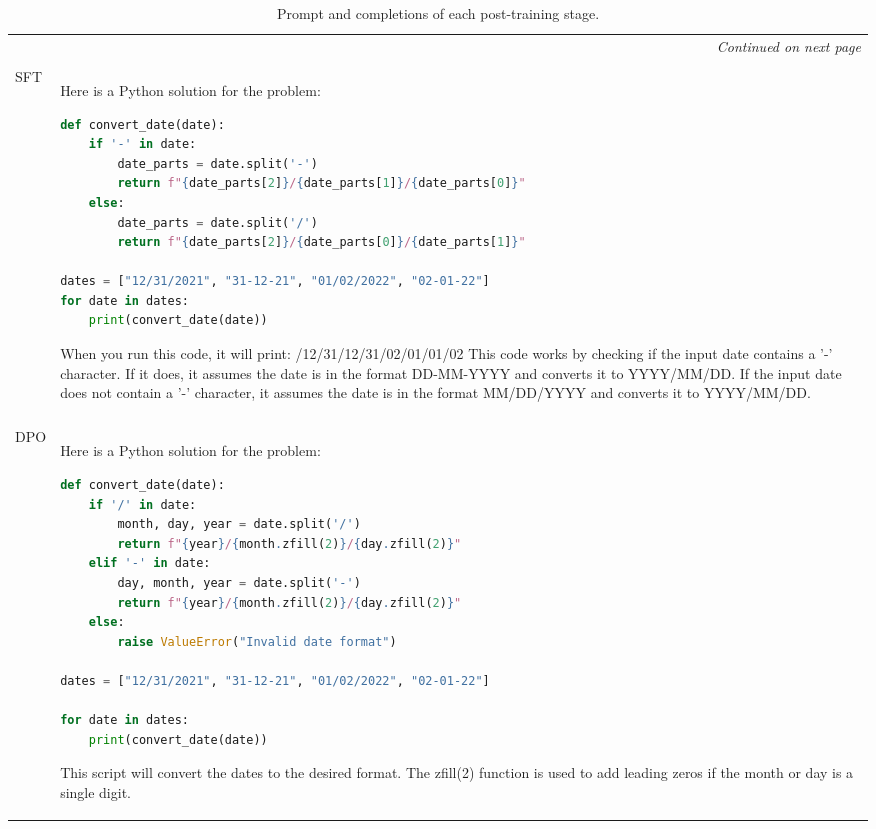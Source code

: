 \begin{CJK}{UTF8}{mj}
\begin{longtable}{lp{}}
\midrule
\multicolumn{2}{r}{\textit{Continued on next page}} \\
\endfoot

\bottomrule
\caption{Prompt and completions of each post-training stage.}
\label{tab:completions_during_post_train_2} \\
\endlastfoot

SFT & Here is a Python solution for the problem:

\begin{lstlisting}[language=Python, basicstyle=\scriptsize]
def convert_date(date):
    if '-' in date:
        date_parts = date.split('-')
        return f"{date_parts[2]}/{date_parts[1]}/{date_parts[0]}"
    else:
        date_parts = date.split('/')
        return f"{date_parts[2]}/{date_parts[0]}/{date_parts[1]}"
 
dates = ["12/31/2021", "31-12-21", "01/02/2022", "02-01-22"]
for date in dates:
    print(convert_date(date))
\end{lstlisting}

When you run this code, it will print: \newline\newline
2021/12/31\newline
2021/12/31\newline
2022/02/01\newline
2022/01/02\newline
This code works by checking if the input date contains a '-' character.
If it does, it assumes the date is in the format DD-MM-YYYY and converts it to YYYY/MM/DD.
If the input date does not contain a '-' character, it assumes the date is in the format MM/DD/YYYY and converts it to YYYY/MM/DD.

\\\\

DPO & Here is a Python solution for the problem:

\begin{lstlisting}[language=Python, basicstyle=\scriptsize]
def convert_date(date):
    if '/' in date:
        month, day, year = date.split('/')
        return f"{year}/{month.zfill(2)}/{day.zfill(2)}"
    elif '-' in date:
        day, month, year = date.split('-')
        return f"{year}/{month.zfill(2)}/{day.zfill(2)}"
    else:
        raise ValueError("Invalid date format")
 
dates = ["12/31/2021", "31-12-21", "01/02/2022", "02-01-22"]
 
for date in dates:
    print(convert_date(date))
\end{lstlisting}
This script will convert the dates to the desired format. The zfill(2) function is used to add leading zeros if the month or day is a single digit.\newline\newline
 

\end{longtable}
\end{CJK}
